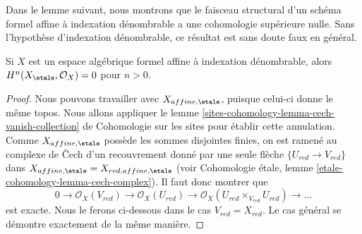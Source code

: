 \noindent
Dans le lemme suivant, nous montrons que le faisceau structural d'un schéma formel
affine à indexation dénombrable a une cohomologie supérieure nulle.
Sans l'hypothèse d'indexation dénombrable, ce résultat est sans doute faux en général.

\begin{lemma}
\label{lemma-higher-vanishing-structure-sheaf}
Si $X$ est un espace algébrique formel affine à indexation dénombrable, alors
$H^n(X_\etale, \mathcal{O}_X) = 0$ pour $n > 0$.
\end{lemma}

\begin{proof}
Nous pouvons travailler avec $X_{affine, \etale}$, puisque celui-ci donne le même topos.
Nous allons appliquer le lemme
\ref{sites-cohomology-lemma-cech-vanish-collection}
de Cohomologie sur les sites pour établir cette annulation. Comme $X_{affine, \etale}$
possède les sommes disjointes finies, on est ramené au complexe de {\v C}ech
d'un recouvrement donné par une seule flèche $\{U_{red} \to V_{red}\}$
dans $X_{affine, \etale} = X_{red, affine, \etale}$
(voir Cohomologie \'etale, lemme \ref{etale-cohomology-lemma-cech-complex}).
Il faut donc montrer que
$$
0 \to \mathcal{O}_X(V_{red}) \to \mathcal{O}_X(U_{red}) \to
\mathcal{O}_X(U_{red} \times_{V_{red}} U_{red}) \to \ldots
$$
est exacte. Nous le ferons ci-dessous dans le cas $V_{red} = X_{red}$.
Le cas général se démontre exactement de la même manière.


\end{proof}
